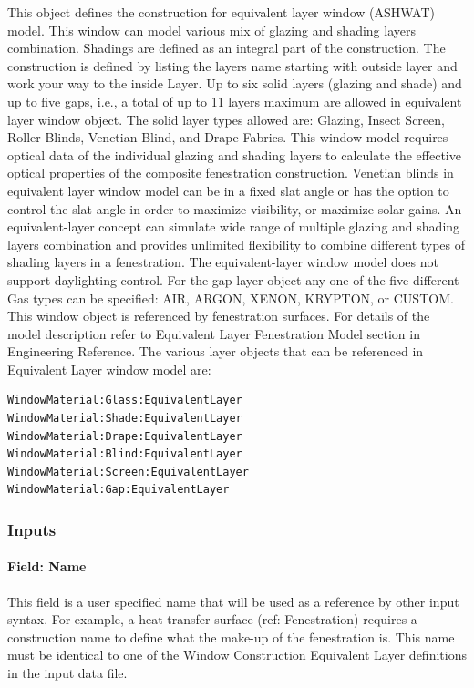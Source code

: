 This object defines the construction for equivalent layer window (ASHWAT) model. This window can model various mix of glazing and shading layers combination. Shadings are defined as an integral part of the construction. The construction is defined by listing the layers name starting with outside layer and work your way to the inside Layer. Up to six solid layers (glazing and shade) and up to five gaps, i.e., a total of up to 11 layers maximum are allowed in equivalent layer window object. The solid layer types allowed are: Glazing, Insect Screen, Roller Blinds, Venetian Blind, and Drape Fabrics. This window model requires optical data of the individual glazing and shading layers to calculate the effective optical properties of the composite fenestration construction. Venetian blinds in equivalent layer window model can be in a fixed slat angle or has the option to control the slat angle in order to maximize visibility, or maximize solar gains. An equivalent-layer concept can simulate wide range of multiple glazing and shading layers combination and provides unlimited flexibility to combine different types of shading layers in a fenestration. The equivalent-layer window model does not support daylighting control. For the gap layer object any one of the five different Gas types can be specified: AIR, ARGON, XENON, KRYPTON, or CUSTOM. This window object is referenced by fenestration surfaces. For details of the model description refer to Equivalent Layer Fenestration Model section in Engineering Reference. The various layer objects that can be referenced in Equivalent Layer window model are:

\begin{lstlisting}
WindowMaterial:Glass:EquivalentLayer
WindowMaterial:Shade:EquivalentLayer
WindowMaterial:Drape:EquivalentLayer
WindowMaterial:Blind:EquivalentLayer
WindowMaterial:Screen:EquivalentLayer
WindowMaterial:Gap:EquivalentLayer
\end{lstlisting}

\subsubsection{Inputs}\label{inputs-41}

\paragraph{Field: Name}\label{field-name-35}

This field is a user specified name that will be used as a reference by other input syntax. For example, a heat transfer surface (ref: Fenestration) requires a construction name to define what the make-up of the fenestration is. This name must be identical to one of the Window Construction Equivalent Layer definitions in the input data file.

